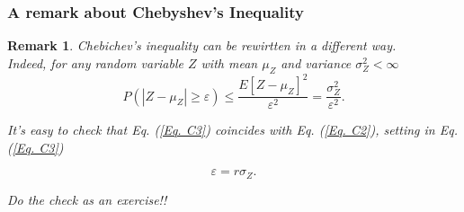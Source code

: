 \documentclass[notes=show,smaller,handout]{beamer}
\newtheorem{remark}{Remark}[section]
\renewcommand{\Pr}{P}
\newenvironment{stepitemize}{\begin{itemize}[<+->]}{\end{itemize} }
\begin{document}
\begin{frame}%

\frametitle{A remark about Chebyshev's Inequality}

\begin{remark}
Chebichev's inequality can be rewirtten in a different way. \\

Indeed, for any random variable $Z$ with mean $\mu_Z$ and variance $\sigma_Z^2<\infty$
\begin{equation}
\Pr \left( \left\vert Z-\mu_Z\right\vert \geq \varepsilon \right) \leq \frac{E[Z-\mu_Z]^2}{\varepsilon^{2}} = \frac{\sigma_Z^2}{\varepsilon^{2}}. \label{Eq. C3}
\end{equation}
 
 It's easy to check  that Eq. (\ref{Eq. C3}) coincides with Eq. (\ref{Eq. C2}), setting in Eq. (\ref{Eq. C3}) 

 $$
 \varepsilon = r \sigma_Z.
 $$

 Do the check as an exercise!!
\end{remark}

\end{frame}%


%
%
%
%
\end{document}
